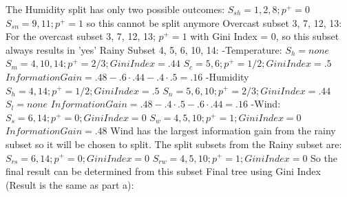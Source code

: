 \documentclass[12pt, fullpage,letterpaper]{article}
\begin{document}
\begin{enumerate}
\begin{enumerate}
	\newline
	\newline The Humidity split has only two possible outcomes: 
	\newline $S_{sh}=1, 2, 8; p^+ =0$
	\newline $S_{sn}=9, 11; p^+ =1$
	\newline so this cannot be split anymore
	\newline
	\newline Overcast subset 3, 7, 12, 13:
	\newline For the overcast subset 3, 7, 12, 13; $p^+=1$ with Gini Index = 0, so this subset always results in 'yes'
	\newline
	\newline Rainy Subset 4, 5, 6, 10, 14:
	\newline -Temperature:
	\newline $S_h = none$
	\newline $S_m=4, 10, 14; p^+=2/3; Gini Index=.44$
	\newline $S_c=5, 6; p^+=1/2; Gini Index=.5$
	\newline $Information Gain=.48-.6\cdot.44-.4\cdot.5=.16$
	\newline -Humidity
	\newline $S_h = 4, 14; p^+=1/2; Gini Index=.5$
	\newline $S_n=5, 6, 10; p^+=2/3; Gini Index=.44$
	\newline $S_l=none$
	\newline $Information Gain=.48-.4\cdot.5-.6\cdot.44=.16$
	\newline -Wind:
	\newline $S_s = 6, 14; p^+=0; Gini Index=0$
	\newline $S_w=4, 5, 10; p^+=1;Gini Index=0$
	\newline $Information Gain=.48$
	\newline Wind has the largest information gain from the rainy subset so it will be chosen to split. 
	\newline
	\newline The split subsets from the Rainy subset are:
	\newline $S_{rs}=6, 14; p^+=0; Gini Index = 0$
	\newline $S_{rw}=4, 5, 10; p^+=1; Gini Index = 0$
	\newline So the final result can be determined from this subset
	\newline
	\newline Final tree using Gini Index (Result is the same as part a):

\end{enumerate}
\end{enumerate}
\end{document}
